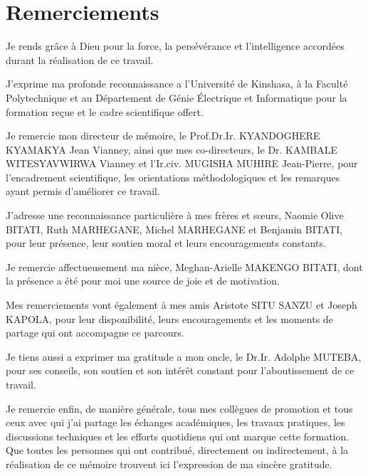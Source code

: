 \chapter*{Remerciements}

Je rends grâce à Dieu pour la force, la persévérance et l'intelligence accordées durant la réalisation de ce travail.

J'exprime ma profonde reconnaissance a l'Université de Kinshasa, à la Faculté Polytechnique et au Département de Génie Électrique et Informatique pour la formation reçue et le cadre scientifique offert.

Je remercie mon directeur de mémoire, le Prof.Dr.Ir. KYANDOGHERE KYAMAKYA Jean Vianney, ainsi que mes co-directeurs, le Dr. KAMBALE WITESYAVWIRWA Vianney et l'Ir.civ. MUGISHA MUHIRE Jean-Pierre, pour l'encadrement scientifique, les orientations méthodologiques et les remarques ayant permis d'améliorer ce travail.

J'adresse une reconnaissance particulière à mes frères et sœurs, Naomie Olive BITATI, Ruth MARHEGANE, Michel MARHEGANE et Benjamin BITATI, pour leur présence, leur soutien moral et leurs encouragements constants.

Je remercie affectueusement ma nièce, Meghan-Arielle MAKENGO BITATI, dont la présence a été pour moi une source de joie et de motivation.

Mes remerciements vont également à mes amis Aristote SITU SANZU et Joseph KAPOLA, pour leur disponibilité, leurs encouragements et les moments de partage qui ont accompagne ce parcours.

Je tiens aussi a exprimer ma gratitude a mon oncle, le Dr.Ir. Adolphe MUTEBA, pour ses conseils, son soutien et son intérêt constant pour l'aboutissement de ce travail.

Je remercie enfin, de manière générale, tous mes collègues de promotion et tous ceux avec qui j'ai partage les échanges académiques, les travaux pratiques, les discussions techniques et les efforts quotidiens qui ont marque cette formation. Que toutes les personnes qui ont contribué, directement ou indirectement, à la réalisation de ce mémoire trouvent ici l'expression de ma sincère gratitude.
